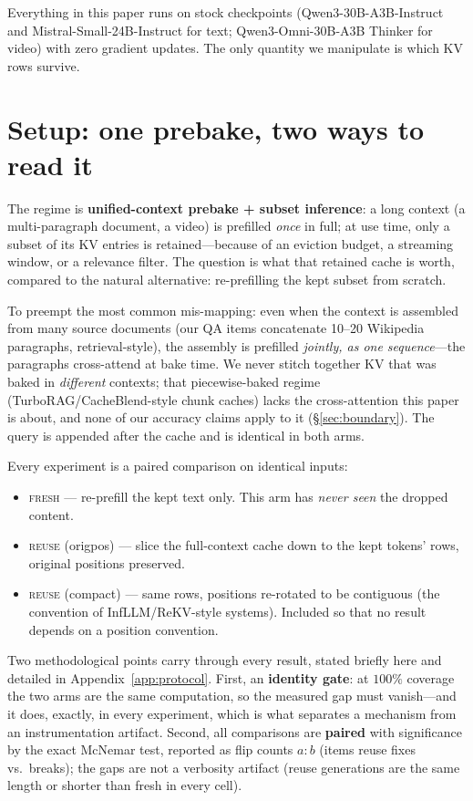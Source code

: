 \documentclass[11pt]{article}
\newcommand{\fresh}{\textsc{fresh}}
\newcommand{\reuse}{\textsc{reuse}}
\begin{document}
Everything in this paper runs on stock checkpoints (Qwen3-30B-A3B-Instruct and Mistral-Small-24B-Instruct for text; Qwen3-Omni-30B-A3B Thinker for video) with zero gradient updates. The only quantity we manipulate is which KV rows survive.

\section{Setup: one prebake, two ways to read it}
\label{sec:setup}

The regime is \textbf{unified-context prebake + subset inference}: a long context (a multi-paragraph document, a video) is prefilled \emph{once} in full; at use time, only a subset of its KV entries is retained---because of an eviction budget, a streaming window, or a relevance filter. The question is what that retained cache is worth, compared to the natural alternative: re-prefilling the kept subset from scratch.

To preempt the most common mis-mapping: even when the context is assembled from many source documents (our QA items concatenate 10--20 Wikipedia paragraphs, retrieval-style), the assembly is prefilled \emph{jointly, as one sequence}---the paragraphs cross-attend at bake time. We never stitch together KV that was baked in \emph{different} contexts; that piecewise-baked regime (TurboRAG\slash CacheBlend-style chunk caches) lacks the cross-attention this paper is about, and none of our accuracy claims apply to it (\S\ref{sec:boundary}). The query is appended after the cache and is identical in both arms.

Every experiment is a paired comparison on identical inputs:

\begin{itemize}[leftmargin=2em]
\item \fresh{} --- re-prefill the kept text only. This arm has \emph{never seen} the dropped content.
\item \reuse{} (origpos) --- slice the full-context cache down to the kept tokens' rows, original positions preserved.
\item \reuse{} (compact) --- same rows, positions re-rotated to be contiguous (the convention of InfLLM/ReKV-style systems). Included so that no result depends on a position convention.
\end{itemize}

Two methodological points carry through every result, stated briefly here and detailed in Appendix~\ref{app:protocol}. First, an \textbf{identity gate}: at $100\%$ coverage the two arms are the same computation, so the measured gap must vanish---and it does, exactly, in every experiment, which is what separates a mechanism from an instrumentation artifact. Second, all comparisons are \textbf{paired} with significance by the exact McNemar test, reported as flip counts $a{:}b$ (items reuse fixes vs.\ breaks); the gaps are not a verbosity artifact (reuse generations are the same length or shorter than fresh in every cell).
\end{document}
